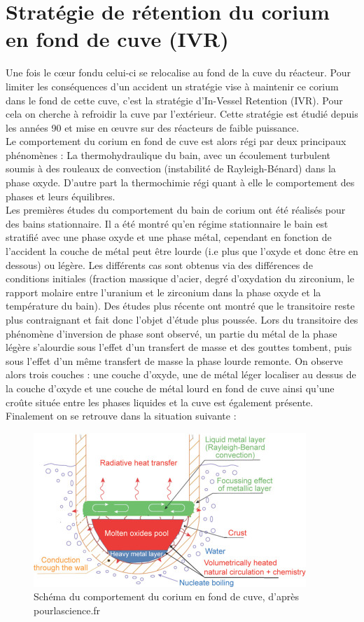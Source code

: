 \documentclass[a4paper,11pt,fleqn]{report}    %
\begin{document}
\section{Stratégie de rétention du corium en fond de cuve (IVR)}
Une fois le c\oe ur fondu celui-ci se relocalise au fond de la cuve du réacteur. Pour limiter les conséquences d'un accident un stratégie vise à maintenir ce corium dans le fond de cette cuve, c'est la stratégie d'In-Vessel Retention (IVR). Pour cela on cherche à refroidir la cuve par l'extérieur. Cette stratégie est étudié depuis les années 90 et mise en \oe uvre sur des réacteurs de faible puissance. \\
Le comportement du corium en fond de cuve est alors régi par deux principaux phénomènes :
La thermohydraulique du bain, avec un écoulement turbulent soumis à des rouleaux de convection (instabilité de Rayleigh-Bénard) dans la phase oxyde. D'autre part la thermochimie régi quant à elle le comportement des phases et leurs équilibres. \\
Les premières études du comportement du bain de corium ont été réalisés pour des bains stationnaire. Il a été montré qu'en régime stationnaire le bain est stratifié avec une phase oxyde et une phase métal, cependant en fonction de l'accident la couche de métal peut être lourde (i.e plus que l'oxyde et donc être en dessous) ou légère. Les différents cas sont obtenus via des différences de conditions initiales (fraction massique d'acier, degré d'oxydation du zirconium, le rapport molaire entre l'uranium et le zirconium dans la phase oxyde et la température du bain). Des études plus récente ont montré que le transitoire reste plus contraignant et fait donc l'objet d'étude plus poussée. Lors du transitoire des phénomène d'inversion de phase sont observé, un partie du métal de la phase légère s'alourdie sous l'effet d'un transfert de masse et des gouttes tombent, puis sous l'effet d'un même transfert de masse la phase lourde remonte. On observe alors trois couches : une couche d'oxyde, une de métal léger localiser au dessus de la couche d'oxyde et une couche de métal lourd en fond de cuve ainsi qu'une croûte située entre les phases liquides et la cuve est également présente. Finalement on se retrouve dans la situation suivante :
\begin{figure}[h!]
	\centering
	\includegraphics[width=0.6\linewidth]{figure/IVR_schema}
	\caption[Schéma du comportement du corium en fond de cuve]{Schéma du comportement du corium en fond de cuve, d'après pourlascience.fr}
	\label{fig:ivrschema}
\end{figure}
\end{document}
